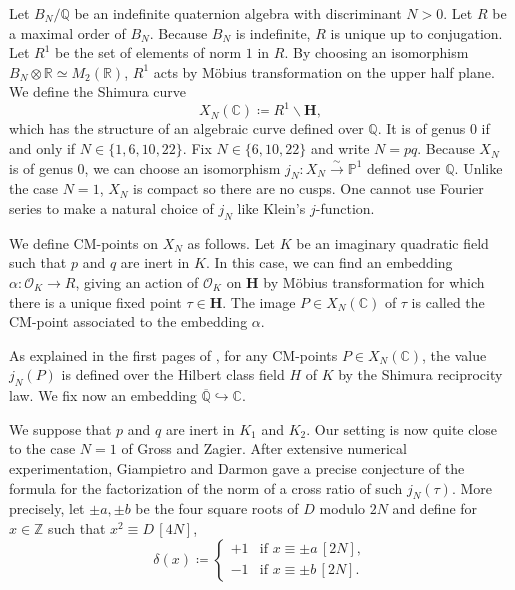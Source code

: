 \documentclass[a4paper,12pt]{article}
\newcommand{\QQ}{\mathbb{Q}}
\newcommand{\CC}{\mathbb{C}}
\begin{document}
\par Let $B_N/\mathbb{Q}$ be an indefinite quaternion algebra with discriminant $N>0$. Let  $R$ be a maximal order of $B_N$. Because $B_N$ is indefinite, $R$ is unique up to conjugation. Let $R^1$ be the set of elements of norm $1$ in $R$. By choosing an isomorphism  ~$B_N\otimes\mathbb{R} \simeq M_2(\mathbb{R})$, $R^1$ acts by Möbius transformation on the upper half plane.
We define the Shimura curve 
\[X_N(\mathbb{C})\coloneqq R^1\backslash\mathbf{H},\]
which has the structure of an algebraic curve defined over $\mathbb{Q}$. It is of genus $0$ if and only if $N\in \{1,6,10,22 \}$. 
Fix $N\in\{6,10,22 \}$ and write $N=pq$. Because $X_N$ is of genus 0, we can choose an isomorphism  $j_N : X_N \stackrel{\sim}{\longrightarrow} \mathbb{P}^1$ defined over $\QQ$.  Unlike the case $N=1$, $X_N$ is compact so there are no cusps. One cannot use Fourier series to make a natural choice of $j_N$ like Klein's $j$-function.
\par
We define CM-points on $X_N$ as follows. Let $K$ be an imaginary quadratic field such that $p$ and $q$ are inert in $K$. In this case, we can find an embedding $\alpha:\mathcal{O}_K\rightarrow R$, giving an action of $\mathcal{O}_K$ on  $\mathbf{H}$ by Möbius transformation for which there is a unique fixed point $\tau\in\mathbf{H}$. The image $P\in X_N(\CC)$ of $\tau$ is called the CM-point associated to the embedding $\alpha$.
\par
As explained in the first pages of \cite{Shimura}, for any CM-points $P\in X_N(\CC)$, the value $j_N(P)$ is defined over the Hilbert class field $H$ of $K$ by the Shimura reciprocity law. We fix now an embedding $\overline{\QQ}\hookrightarrow\CC.$
\par
 We suppose that $p$ and $q$ are inert in $K_1$ and $K_2$. Our setting is now quite close to the case $N=1$ of Gross and Zagier. After extensive numerical experimentation, Giampietro and Darmon \cite{GiampetroDarmon} gave a precise conjecture of the formula for the factorization of the norm of a cross ratio of such $j_N(\tau)$. More precisely, let ${\pm a,\pm b}$ be the four square roots of $D$ modulo $2N$ and define for $x\in\mathbb{Z}$ such that $x^2\equiv D\,[4N]$,
\begin{equation}
\delta(x)\coloneqq \begin{cases}
      +1 & \text{if  } x\equiv \pm a \,[2N],\\
      -1 & \text{if  } x\equiv \pm b\, [2N].
      \end{cases}
\end{equation}
\end{document}
